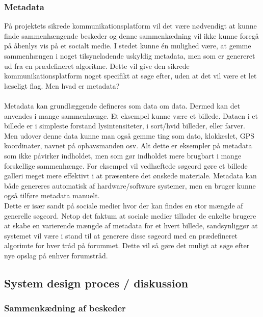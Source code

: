 \subsubsection{Metadata}
\label{Metadata}
På projektets sikrede kommunikationsplatform vil det være nødvendigt at kunne finde sammenhængende beskeder og denne sammenkædning vil ikke kunne foregå på åbenlys vis på et socialt medie. I stedet kunne én mulighed være, at gemme sammenhængen i noget tilsyneladende uskyldig metadata, men som er genereret ud fra en prædefineret algoritme. Dette vil give den sikrede kommunikationsplatform noget specifikt at søge efter, uden at det vil være et let læseligt flag. Men hvad er metadata?\\\\
Metadata kan grundlæggende defineres som data om data. Dermed kan det anvendes i mange sammenhænge. Et eksempel kunne være et billede. Dataen i et billede er i simpleste forstand lysintensiteter, i sort/hvid billeder, eller farver. Men udover denne data kunne man også gemme ting som dato, klokkeslet, GPS koordinater, navnet på ophavsmanden osv. Alt dette er eksempler på metadata som ikke påvirker indholdet, men som gør indholdet mere brugbart i mange forskellige sammenhænge. For eksempel vil vedhæftede søgeord gøre et billede galleri meget mere effektivt i at præsentere det ønskede materiale. Metadata kan både genereres automatisk af hardware/software systemer, men en bruger kunne også tilføre metadata manuelt.\\ Dette er især sandt på sociale medier hvor der kan findes en stor mængde af generelle søgeord. Netop det faktum at sociale medier tillader de enkelte brugere at skabe en varierende mængde af metadata for et hvert billede, sandsynliggør at systemet vil være i stand til at generere disse søgeord med en prædefineret algorimte for hver tråd på forummet. Dette vil så gøre det muligt at søge efter nye opslag på enhver forumstråd.



\subsection{System design proces / diskussion}

\subsubsection{Sammenkædning af beskeder}


